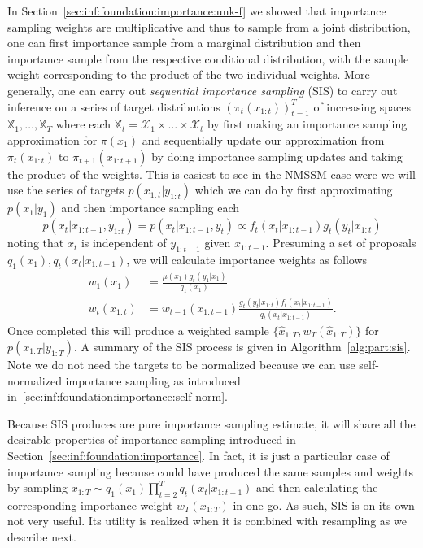 In Section~\ref{sec:inf:foundation:importance:unk-f} we showed that importance sampling weights
are multiplicative and thus to sample from a joint
distribution, one can first importance sample from a marginal distribution and then importance
sample from the respective conditional distribution, with the sample weight corresponding to the
product of the two individual weights.  More generally, one can carry out \emph{sequential importance
	sampling} (SIS) to carry out inference on a series of target distributions $(\pi_t(x_{1:t}))_{t = 1}^T$ of 
increasing spaces $\mathbb{X}_1,\dots,\mathbb{X}_T$ where each
$\mathbb{X}_t = \mathcal{X}_1 \times \dots \times \mathcal{X}_t$ by first making
an importance sampling approximation for $\pi(x_1)$ and sequentially update our approximation from
$\pi_t(x_{1:t})$ to $\pi_{t+1}(x_{1:t+1})$ by doing importance sampling updates and taking the product of
the weights.  This is easiest to see in the NMSSM case were we will use the series of targets $p(x_{1:t}|y_{1:t})$
which we can do by first approximating $p(x_1 | y_1)$ and then importance sampling each 
\[
p (x_t | x_{1:t-1}, y_{1:t})=p(x_t | x_{1:t-1}, y_t)\propto f_{t}(x_t | x_{1:t-1}) g_{t}(y_t | x_{1:t})
\]
noting that $x_t$ is independent of $y_{1:t-1}$ given $x_{1:t-1}$.  
Presuming a set of proposals 
$q_1(x_1), q_t(x_t | x_{1:t-1})$, we will calculate importance weights as follows
\begin{subequations}
	\label{eq:part:sis-weights}
\begin{align}
w_1 (x_1) &= \frac{\mu (x_1)g_{t}(y_1 | x_1)}{q_1(x_1)} \\
w_t (x_{1:t}) &= w_{t-1} (x_{1:t-1}) \frac{g_{t}(y_t|x_{1:t}) f_{t}(x_t | x_{1:t-1})}{q_t(x_t|x_{1:t-1})}.
\end{align}
\end{subequations}
Once completed this will produce a weighted sample $\{\hat{x}_{1:T},\bar{w}_T(\hat{x}_{1:T})\}$ for 
$p(x_{1:T} | y_{1:T})$.  A summary of the SIS process is given in Algorithm~\ref{alg:part:sis}.
Note we do not need the targets to be normalized because we can use self-normalized importance sampling
as introduced in~\ref{sec:inf:foundation:importance:self-norm}.

Because SIS produces are pure importance sampling estimate, it will share all the desirable properties
of importance sampling introduced in Section~\ref{sec:inf:foundation:importance}.  In fact, it is just
a particular case of importance sampling because could have produced the same samples and weights
by sampling $x_{1:T} \sim q_1(x_1) \prod_{t=2}^{T} q_t (x_t | x_{1:t-1})$ and then calculating the
corresponding importance weight $w_T(x_{1:T})$ in one go. As such, 
SIS is on its own not very useful.  Its utility is realized when it is combined with resampling as we describe next.

